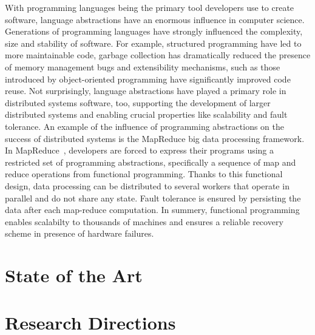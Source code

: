 \documentclass[
graybox,
envcountchap,
]{svmult}
\begin{document}
\begin{bibunit}
With programming languages being the primary tool developers 
use to create software, language abstractions have an 
enormous influence in computer science.
Generations of programming languages have strongly influenced 
the complexity, size and stability of software.
For example, structured programming have led to more 
maintainable code, garbage collection has dramatically 
reduced the presence of memory management bugs and
extensibility mechanisms, such as those introduced
by object-oriented programming have significantly 
improved code reuse.
Not surprisingly, language abstractions
have played a primary role in distributed systems software,
too, supporting the development of larger distributed systems
and enabling crucial properties like scalability and 
fault tolerance.
%
An example of the influence of programming abstractions
on the success of distributed systems is the MapReduce
big data processing framework.
In MapReduce~\cite{Dean:2008:MSD:1327452.1327492}, 
developers are forced to express their programs
using a restricted set of programming abstractions, specifically
a sequence of map and reduce operations from functional programming.
Thanks to this functional design, data processing can 
be distributed to several workers that operate in parallel and
do not share any state. Fault tolerance is ensured by persisting the
data after each map-reduce computation.
In summery, functional programming enables scalabilty to 
thousands of machines and ensures a reliable recovery scheme
in presence of hardware failures.



\section{State of the Art}
\label{sec:sota}

\section{Research Directions}
\label{sec:directions}


\end{bibunit}
\end{document}
